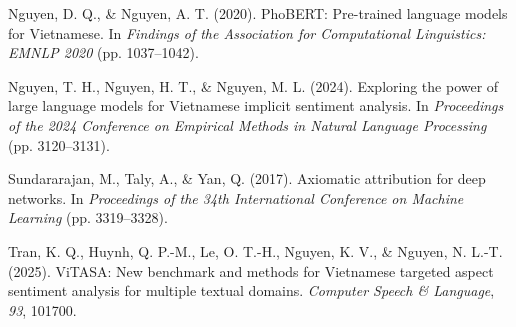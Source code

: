 \documentclass[a4paper,12pt]{extarticle}
\begin{document}
Nguyen, D. Q., \& Nguyen, A. T. (2020). PhoBERT: Pre-trained language models for Vietnamese. In \textit{Findings of the Association for Computational Linguistics: EMNLP 2020} (pp. 1037--1042).


Nguyen, T. H., Nguyen, H. T., \& Nguyen, M. L. (2024). Exploring the power of large language models for Vietnamese implicit sentiment analysis. In \textit{Proceedings of the 2024 Conference on Empirical Methods in Natural Language Processing} (pp. 3120--3131).


Sundararajan, M., Taly, A., \& Yan, Q. (2017). Axiomatic attribution for deep networks. In \textit{Proceedings of the 34th International Conference on Machine Learning} (pp. 3319--3328).


Tran, K. Q., Huynh, Q. P.-M., Le, O. T.-H., Nguyen, K. V., \& Nguyen, N. L.-T. (2025). ViTASA: New benchmark and methods for Vietnamese targeted aspect sentiment analysis for multiple textual domains. \textit{Computer Speech \& Language}, \textit{93}, 101700.
\end{document}
